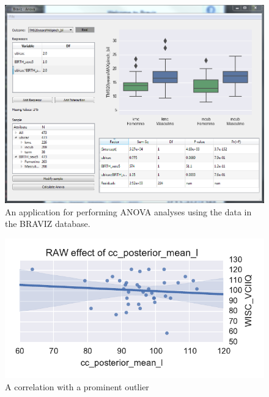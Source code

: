 \documentclass{frontiersHLTH}
\begin{document}
\begin{figure}
\begin{center}
\includegraphics[width=\linewidth]{anova.png}
\end{center}
 \caption{\label{fig_anova}An application for performing ANOVA analyses using the data in the BRAVIZ database.}
\end{figure}

\begin{figure}
\begin{center}
\includegraphics[width=\linewidth]{initial_corr}
\end{center}
 \caption{\label{fig_lm}A correlation with a prominent outlier}
\end{figure}
\end{document}
